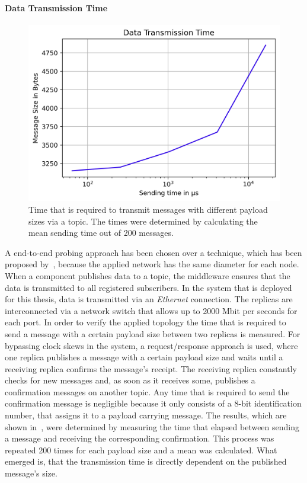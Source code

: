 \paragraph{Data Transmission Time}
\begin{figure}[!hb]
	\centering
	\includegraphics[width=0.75\linewidth]{images/plots/sendingTimes}
	\caption{Time that is required to transmit messages with different payload sizes via a  topic. The times were determined by calculating the mean sending time out of 200 messages.}
	\label{fig:PlotSendingTimes}
\end{figure}


A end-to-end probing approach has been chosen over a   technique, which has been proposed by~\cite{SinhaMeasureNetworkLatency}, because the applied network has the same diameter for each node.
When a component publishes data to a  topic, the middleware ensures that the data is transmitted to all registered subscribers.
In the system that is deployed for this thesis, data is transmitted via an \textit{Ethernet} connection.
The replicas are interconnected via a network switch that allows up to 2000 Mbit per seconds for each port.
In order to verify the applied topology the time that is required to send a message with a certain payload size between two replicas is measured.
For bypassing clock skews in the system, a request/response approach is used, where one replica publishes a message with a certain payload size and waits until a receiving replica confirms the message's receipt.
The receiving replica constantly checks for new messages and, as soon as it receives some, publishes a confirmation messages on another topic.
Any time that is required to send the confirmation message is negligible because it only consists of a 8-bit identification number, that assigns it to a payload carrying message.
The results, which are shown in~\cite{fig:PlotSendingTimes}, were determined by measuring the time that elapsed between sending a message and receiving the corresponding confirmation.
This process was repeated 200 times for each payload size and a mean was calculated.
What emerged is, that the transmission time is directly dependent on the published message's size.
\\

